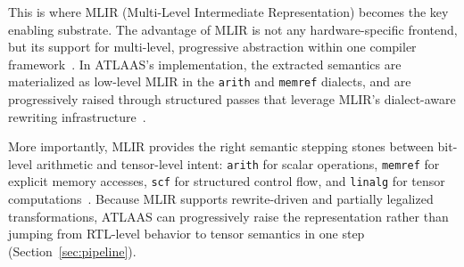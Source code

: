 This is where MLIR (Multi-Level Intermediate Representation) becomes the key enabling substrate.
The advantage of MLIR is not any hardware-specific frontend, but its support for multi-level, progressive abstraction within one compiler framework~\cite{mlir-cgo2021}.
In ATLAAS's implementation, the extracted semantics are materialized as low-level MLIR in the \texttt{arith} and \texttt{memref} dialects, and are progressively raised through structured passes that leverage MLIR's dialect-aware rewriting infrastructure~\cite{mlir-cgo2021, mlir-pattern-rewriting}.

More importantly, MLIR provides the right semantic stepping stones between bit-level arithmetic and tensor-level intent: \texttt{arith} for scalar operations, \texttt{memref} for explicit memory accesses, \texttt{scf} for structured control flow, and \texttt{linalg} for tensor computations~\cite{mlir-pattern-rewriting, mlir-partial-lowering, mlir-linalg-dialect}.
Because MLIR supports rewrite-driven and partially legalized transformations, ATLAAS can progressively raise the representation rather than jumping from RTL-level behavior to tensor semantics in one step (Section~\ref{sec:pipeline}).
